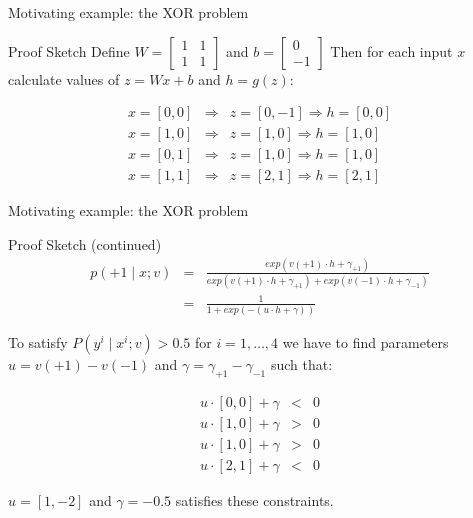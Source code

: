 \begin{frame}{Motivating example: the XOR problem}
\begin{block}{Proof Sketch}
Define $W = \begin{bmatrix}
 1 & 1 \\
 1 & 1 
 \end{bmatrix}$ 
and $b = \begin{bmatrix} 0 \\ -1 \end{bmatrix}$
\pause
Then for each input $x$ calculate values of $z = Wx+b$ and $h=g(z)$:

\begin{eqnarray*}
x = [0,0] &\Rightarrow& z = [0,-1] \Rightarrow h = [0,0] \\
x = [1,0] &\Rightarrow& z = [1,0] \Rightarrow h = [1,0] \\
x = [0,1] &\Rightarrow& z = [1,0] \Rightarrow h = [1,0] \\
x = [1,1] &\Rightarrow& z = [2,1] \Rightarrow h = [2,1] 
\end{eqnarray*}
\end{block}
\end{frame}

\begin{frame}{Motivating example: the XOR problem}
\begin{block}{Proof Sketch (continued)}
\begin{eqnarray*}
p(+1 \mid x; v) &=& \frac{exp(v(+1) \cdot h  + \gamma_{+1})}{exp(v(+1) \cdot h  + \gamma_{+1}) + exp(v(-1) \cdot h + \gamma_{-1})} \\
&=& \frac{1}{1 + exp(-(u \cdot h + \gamma))}
\end{eqnarray*}

\pause
To satisfy $P(y^i \mid x^i; v) > 0.5$ for $i = 1,\ldots,4$
we have to find parameters $u = v(+1) - v(-1)$ and $\gamma = \gamma_{+1} - \gamma_{-1}$
such that:

\begin{eqnarray*}
u \cdot [0,0] + \gamma &<& 0 \\
u \cdot [1,0] + \gamma &>& 0 \\
u \cdot [1,0] + \gamma &>& 0 \\
u \cdot [2,1] + \gamma &<& 0
\end{eqnarray*}

$u = [1, -2]$ and $\gamma = -0.5$ satisfies these constraints.
\end{block}
\end{frame}

